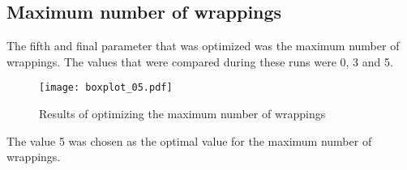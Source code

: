 \subsection{Maximum number of wrappings}
The fifth and final parameter that was optimized was the maximum number of wrappings. The values that were compared during these runs were 0, 3 and 5.

\begin{figure}[H]
	\centering
	\texttt{[image: boxplot\_05.pdf]}
	\caption{Results of optimizing the maximum number of wrappings}
\end{figure}

The value 5 was chosen as the optimal value for the maximum number of wrappings.
